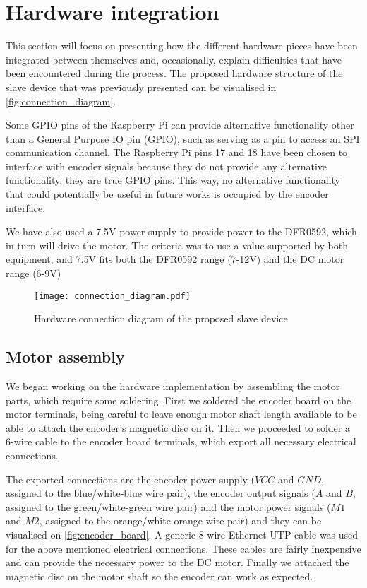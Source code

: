 \section{Hardware integration} \label{sec:hardware-devel}
This section will focus on presenting how the different hardware pieces have been integrated between themselves and, occasionally, explain difficulties that have been encountered during the process.
The proposed hardware structure of the slave device that was previously presented can be visualised in \autoref{fig:connection_diagram}.

Some GPIO pins of the Raspberry Pi can provide alternative functionality other than a General Purpose IO pin (GPIO), such as serving as a pin to access an SPI communication channel.
The Raspberry Pi pins 17 and 18 have been chosen to interface with encoder signals because they do not provide any alternative functionality, they are true GPIO pins.
This way, no alternative functionality that could potentially be useful in future works is occupied by the encoder interface.

We have also used a 7.5V power supply to provide power to the DFR0592, which in turn will drive the motor.
The criteria was to use a value supported by both equipment, and 7.5V fits both the DFR0592 range (7-12V) and the DC motor range (6-9V)

\begin{figure}[htp]
	\centering
	\texttt{[image: connection\_diagram.pdf]}
	\caption{Hardware connection diagram of the proposed slave device}
	\label{fig:connection_diagram}
\end{figure}

\subsection{Motor assembly}
We began working on the hardware implementation by assembling the motor parts, which require some soldering.
First we soldered the encoder board on the motor terminals, being careful to leave enough motor shaft length available to be able to attach the encoder's magnetic disc on it.
Then we proceeded to solder a 6-wire cable to the encoder board terminals, which export all necessary electrical connections.

The exported connections are the encoder power supply ($VCC$ and $GND$, assigned to the blue/white-blue wire pair), the encoder output signals ($A$ and $B$, assigned to the green/white-green wire pair) and the motor power signals ($M1$ and $M2$, assigned to the orange/white-orange wire pair) and they can be visualised on \autoref{fig:encoder_board}.
A generic 8-wire Ethernet UTP cable was used for the above mentioned electrical connections.
These cables are fairly inexpensive and can provide the necessary power to the DC motor.
Finally we attached the magnetic disc on the motor shaft so the encoder can work as expected.

